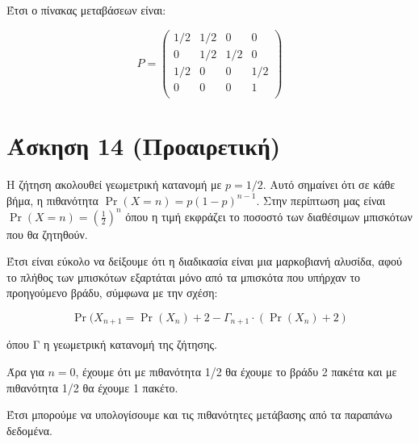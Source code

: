 \documentclass{article}
\begin{document}
Έτσι ο πίνακας μεταβάσεων είναι:

\begin{equation*}
    P = 
    \begin{pmatrix}
        1/2 & 1/2 & 0 & 0\\
        0 & 1/2 & 1/2 & 0\\
        1/2 & 0 & 0 & 1/2\\
        0 & 0 & 0 & 1\\
    \end{pmatrix}
\end{equation*}

\section*{Άσκηση 14 (Προαιρετική)}

Η ζήτηση ακολουθεί γεωμετρική κατανομή με $p=1/2$. Αυτό σημαίνει ότι σε κάθε βήμα, η πιθανότητα $\Pr(X=n) = p(1-p)^{n-1}$. Στην περίπτωση μας είναι $\Pr(X=n) = (\frac{1}{2})^n$ όπου η τιμή εκφράζει το ποσοστό των διαθέσιμων μπισκότων που θα ζητηθούν. 

Έτσι είναι εύκολο να δείξουμε ότι η διαδικασία είναι μια μαρκοβιανή αλυσίδα, αφού το πλήθος των μπισκότων εξαρτάται μόνο από τα μπισκότα που υπήρχαν το προηγούμενο βράδυ, σύμφωνα με την σχέση:

\begin{equation*}
    \Pr(X_{n+1} = \Pr(X_n) + 2 - Γ_{n+1} \cdot (\Pr(X_n) + 2)
\end{equation*}

όπου Γ η γεωμετρική κατανομή της ζήτησης.

Άρα για $n=0$, έχουμε ότι με πιθανότητα 1/2 θα έχουμε το βράδυ 2 πακέτα και με πιθανότητα 1/2 θα έχουμε 1 πακέτο. 

Έτσι μπορούμε να υπολογίσουμε και τις πιθανότητες μετάβασης από τα παραπάνω δεδομένα. 
\end{document}
